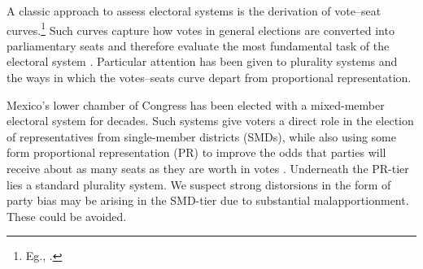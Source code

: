 \documentclass[letter,12pt]{article}
\begin{document}

\onehalfspacing




\noindent A classic approach to assess electoral systems is the derivation of vote--seat curves.\footnote{Eg., \citet{rae.1967,tufte1973seatsVotes,erikson1972malapportionment,dahl.1956prefDemoc,gudgin.taylor.1979seatsVotes,taagepera.shugart.1989,taagepera.CubeLaw.1973,king1990elRespBiasMultiparty,king.browning1987biasRespUS,gelman.king.1994EvalElSysRedis}.} Such curves capture how votes in general elections are converted into parliamentary seats and therefore evaluate the most fundamental task of the electoral system \citep{lijphartElSysPtySys.1994}. Particular attention has been given to plurality systems and the ways in which the votes--seats curve depart from proportional representation. 

Mexico's lower chamber of Congress has been elected with a mixed-member electoral system for decades. Such systems give voters a direct role in the election of representatives from single-member districts (SMDs), while also using some form proportional representation (PR) to improve the odds that parties will receive about as many seats as they are worth in votes \citep{shugart.wattenbergIntro2001}. Underneath the PR-tier lies a standard plurality system. We suspect strong distorsions in the form of party bias may be arising in the SMD-tier due to substantial malapportionment. These could be avoided. 
\end{document}
